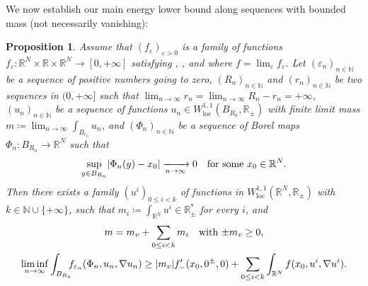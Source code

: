 \documentclass[JEP,XML,SOM,Unicode,published]{cedram}
\theoremstyle{plain}
\newtheorem{proposition}[theorem]{Proposition}
\theoremstyle{definition}
\newcommand{\N}{\mathbb{N}}
\newcommand{\R}{\mathbb{R}}
\newcommand{\loc}{\mathrm{loc}}
\newcommand{\eps}{\varepsilon}
\DeclarePairedDelimiter{\abs}{\lvert}{\rvert}
\newcommand{\xto}[2][]{\xrightarrow[#2]{#1}}
\begin{document}
We now establish our main energy lower bound along sequences with bounded mass (not necessarily vanishing):
\begin{proposition}\label{almostMinimisers}
Assume that $(f_\eps)_{\eps > 0}$ is a family of functions \(f_\eps:\R^N\times\R\times\R^N\to[0,+\infty]\) satisfying , ,  and  where \(f = \lim_\eps f_\eps\). Let \((\eps_n)_{n\in\N}\) be a sequence of positive numbers going to zero, \((R_n)_{n\in\N}\) and \((r_n)_{n\in\N}\) be two sequences in \((0,+\infty]\) such that \(\lim_{n\to\infty}r_n=\lim_{n\to\infty} R_n-r_n= +\infty\), \((u_n)_{n\in\N}\) be a sequence of functions \(u_n \in W^{1,1}_\loc(B_{R_n},\R_\pm)\) with finite limit mass $m \coloneqq \lim_{n\to\infty} \int_{B_{r_n}} u_n$, and $(\Phi_n)_{n\in\N}$ be a sequence of Borel maps \(\Phi_n:B_{R_n}\to\R^N\) such that
\begin{equation}
\label{hypPhiN}
\sup_{y\in B_{R_n}}\abs{\Phi_n(y)-x_0} \xto{n\to\infty} 0\quad \text{for some \(x_0\in\R^N\).}
\end{equation}
Then there exists a family \((u^i)_{0\leq i<k}\) of functions in \(W^{1,1}_\loc(\R^N,\R_\pm)\) with \(k\in\N\cup\{+\infty\}\), such that \(m_i\coloneqq\int_{\R^N}u^i\in\R_\pm^\ast\) for every \(i\), and
\begin{gather}\label{MassVanishingFormula}
m=m_v+\sum_{0\leq i<k}m_i\quad\text{with \(\pm m_v\geq 0\),}\\
\label{decompositionSequences}
\liminf_{n\to\infty}\int_{B_{R_n}}\hspace*{-2mm}f_{\eps_n}(\Phi_n,u_n,\nabla u_n) \geq \abs{m_v} f'_-(x_0,0^\pm,0)+\sum_{0\leq i<k}\int_{\R^N}f(x_0,u^i,\nabla u^i).
\end{gather}
\end{proposition}
\end{document}
